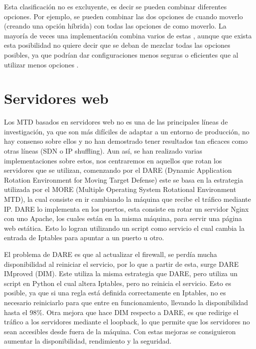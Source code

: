 Esta clasificación no es excluyente, es decir se pueden combinar diferentes opciones. Por ejemplo, se pueden combinar las dos opciones de cuando moverlo (creando una opción híbrida) con todas las opciones de como moverlo. La mayoría de veces una implementación combina varios de estas \cite{MTD-MORE+DARE+Java}\cite{MTD-DARE}\cite{MTD-arab}, aunque que exista esta posibilidad no quiere decir que se deban de mezclar todas las opciones posibles, ya que podrían dar configuraciones menos seguras o eficientes que al utilizar menos opciones \cite{MTD-comparativa-gorda}.

\section{Servidores web}
Los MTD basados en servidores web no es una de las principales líneas de investigación, ya que son más difíciles de adaptar a un entorno de producción, no hay consenso sobre ellos y no han demostrado tener resultados tan eficaces como otras líneas (SDN o IP shuffling). Aun así, se han realizado varias implementaciones sobre estos, nos centraremos en aquellos que rotan los servidores que se utilizan, comenzando por el DARE (Dynamic Application Rotation Environment for Moving Target Defense) este se basa en la estrategia utilizada por el MORE (Multiple Operating System Rotational Environment MTD)\cite{MORE}, la cual consiste en ir cambiando la máquina que recibe el tráfico mediante IP. DARE lo implementa en los puertos, esta consiste en rotar un servidor Nginx\cite{nginx} con uno Apache\cite{apache}, los cuales están en la misma máquina, para servir una página web estática. Esto lo logran utilizando un script como servicio el cual cambia la entrada de Iptables\cite{iptables} para apuntar a un puerto u otro.

El problema de DARE es que al actualizar el firewall, se perdía mucha disponibilidad al reiniciar el servicio, por lo que a partir de esta, surge DARE IMproved (DIM). Este utiliza la misma estrategia que DARE, pero utiliza un script en Python el cual altera Iptables, pero no reinicia el servicio. Esto es posible, ya que si una regla está definida correctamente en Iptables, no es necesario reiniciarlo para que entre en funcionamiento, llevando la disponibilidad hasta el 98\%. Otra mejora que hace DIM respecto a DARE, es que redirige el tráfico a los servidores mediante el loopback, lo que permite que los servidores no sean accesibles desde fuera de la máquina. Con estas mejoras se consiguieron aumentar la disponibilidad, rendimiento y la seguridad.

